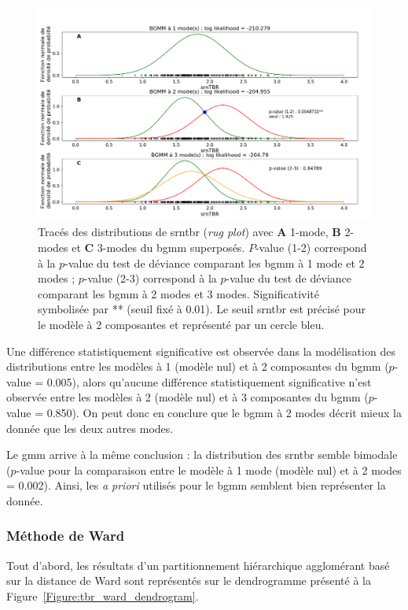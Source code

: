\begin{figure}[h!]
  \centering
	\includegraphics[width=1.0\linewidth]{figures/chapter-4/tbr-bgmm} 
  \caption[Résultats des \gls{bgmm} avec une à trois composantes.]{Tracés des distributions de \gls{srntbr} (\textit{rug plot}) avec \textbf{A} 1-mode, \textbf{B} 2-modes et \textbf{C} 3-modes du \gls{bgmm} superposés. $P$-value (1-2) correspond
	à la $p$-value du test de déviance comparant les \gls{bgmm} à 1 mode et 2 modes ; $p$-value (2-3) correspond à la $p$-value du test de déviance comparant les \gls{bgmm}
	à 2 modes et 3 modes. Significativité symbolisée par ** (seuil fixé à 0.01). Le seuil \gls{srntbr} est précisé pour le modèle à 2 composantes et représenté par un cercle bleu.}
  \label{Figure:tbr_bgmm} 
\end{figure}

Une différence statistiquement significative est observée dans la modélisation des distributions entre les modèles à 1 (modèle nul) et à 2 composantes 
du \gls{bgmm} ($p$-value = 0.005), alors qu'aucune différence statistiquement significative n'est observée entre les modèles à 2 (modèle nul) 
et à 3 composantes du \gls{bgmm} ($p$-value = 0.850). On peut donc en conclure que le \gls{bgmm} à 2 modes décrit mieux la donnée que les deux
autres modes. 

Le \gls{gmm} arrive à la même conclusion : la distribution des \gls{srntbr} semble bimodale ($p$-value pour la comparaison
entre le modèle à 1 mode (modèle nul) et à 2 modes = 0.002). Ainsi, les \textit{a priori} utilisés pour le \gls{bgmm} semblent bien 
représenter la donnée. 

\subsubsection{Méthode de Ward}
Tout d'abord, les résultats d'un partitionnement hiérarchique agglomérant basé sur la distance de Ward sont représentés sur le dendrogramme présenté à la 
Figure~\ref{Figure:tbr_ward_dendrogram}. 


